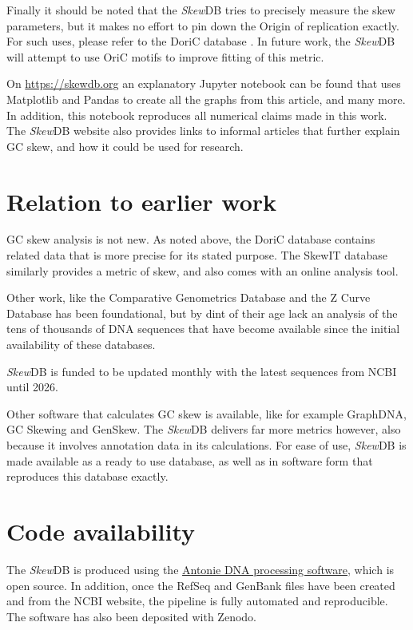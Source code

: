 \documentclass[fleqn,10pt]{wlscirep}
\begin{document}
Finally it should be noted that the \emph{Skew}DB tries to precisely measure the skew parameters, but it makes no effort to pin down the Origin of replication exactly. For such uses, please refer to the DoriC database \cite{luo_doric_2019}. In future work, the \emph{Skew}DB will attempt to use OriC motifs to improve fitting of this metric.

On \url{https://skewdb.org} an explanatory Jupyter \cite{Kluyver:2016aa} notebook can be found that uses Matplotlib \cite{Hunter:2007} and Pandas \cite{jeff_reback_2021_5203279} to create all the graphs from this article, and many more. In addition, this notebook reproduces all numerical claims made in this work. The \emph{Skew}DB website also provides links to informal articles that further explain GC skew, and how it could be used for research.

\section*{Relation to earlier work}
GC skew analysis is not new. As noted above, the DoriC database contains related data that is more precise for its stated purpose. The SkewIT database \cite{lu_skewit_2020} similarly provides a metric of skew, and also comes with an online analysis tool.

Other work, like the Comparative Genometrics Database\cite{Roten2002} and the Z Curve Database \cite{Zhang2003} has been foundational, but by dint of their age lack an analysis of the tens of thousands of DNA sequences that have become available since the initial availability of these databases.

\emph{Skew}DB is funded to be updated monthly with the latest sequences from NCBI until 2026.

Other software that calculates GC skew is available, like for example GraphDNA\cite{Thomas2007}, GC Skewing\cite{Grigoriev1998} and GenSkew. The \emph{Skew}DB delivers far more metrics however, also because it involves annotation data in its calculations. For ease of use, \emph{Skew}DB is made available as a ready to use database, as well as in software form that reproduces this database exactly.

\section*{Code availability}
The \emph{Skew}DB is produced using the \href{https://github.com/berthubert/antonie2}{Antonie DNA processing software}, which is open source. In addition, once the RefSeq and GenBank files have been created and from the NCBI website, the pipeline is fully automated and reproducible. The software has also been deposited with Zenodo\cite{https://doi.org/10.5281/zenodo.5516524}.
\end{document}
